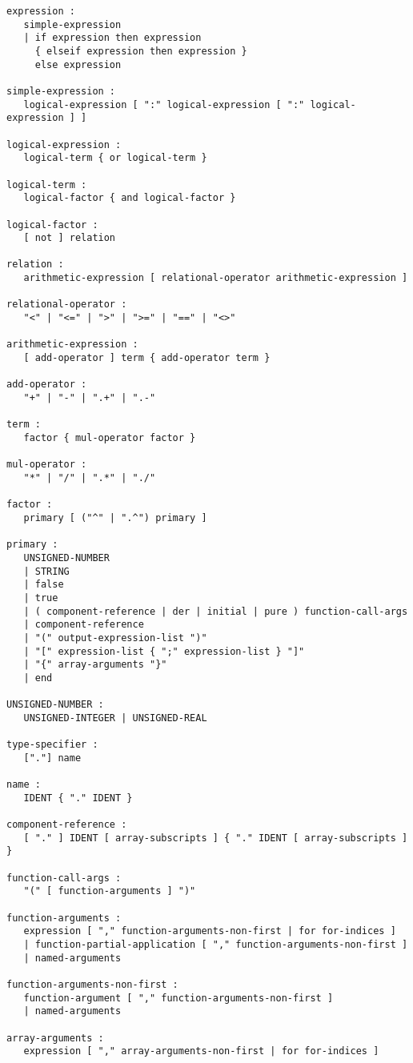 \begin{lstlisting}[language=grammar]
expression :
   simple-expression
   | if expression then expression
     { elseif expression then expression }
     else expression

simple-expression :
   logical-expression [ ":" logical-expression [ ":" logical-expression ] ]

logical-expression :
   logical-term { or logical-term }

logical-term :
   logical-factor { and logical-factor }

logical-factor :
   [ not ] relation

relation :
   arithmetic-expression [ relational-operator arithmetic-expression ]

relational-operator :
   "<" | "<=" | ">" | ">=" | "==" | "<>"

arithmetic-expression :
   [ add-operator ] term { add-operator term }

add-operator :
   "+" | "-" | ".+" | ".-"

term :
   factor { mul-operator factor }

mul-operator :
   "*" | "/" | ".*" | "./"

factor :
   primary [ ("^" | ".^") primary ]

primary :
   UNSIGNED-NUMBER
   | STRING
   | false
   | true
   | ( component-reference | der | initial | pure ) function-call-args
   | component-reference
   | "(" output-expression-list ")"
   | "[" expression-list { ";" expression-list } "]"
   | "{" array-arguments "}"
   | end

UNSIGNED-NUMBER :
   UNSIGNED-INTEGER | UNSIGNED-REAL

type-specifier :
   ["."] name

name :
   IDENT { "." IDENT }

component-reference :
   [ "." ] IDENT [ array-subscripts ] { "." IDENT [ array-subscripts ] }

function-call-args :
   "(" [ function-arguments ] ")"

function-arguments :
   expression [ "," function-arguments-non-first | for for-indices ]
   | function-partial-application [ "," function-arguments-non-first ]
   | named-arguments

function-arguments-non-first :
   function-argument [ "," function-arguments-non-first ]
   | named-arguments

array-arguments :
   expression [ "," array-arguments-non-first | for for-indices ]


\end{lstlisting}
